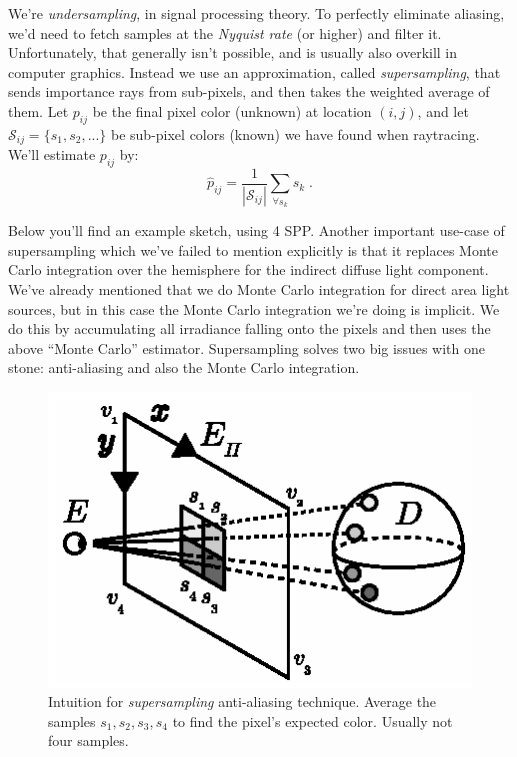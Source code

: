 \documentclass[a4paper, twocolumn]{article}
\begin{document}
            We're \emph{undersampling}, in signal processing theory. To perfectly eliminate aliasing, we'd need to fetch samples at the \emph{Nyquist rate} (or higher) and filter it. Unfortunately, that generally isn't possible, and is usually also overkill in computer graphics. Instead we use an approximation, called \emph{supersampling}, that sends importance rays from sub-pixels, and then takes the weighted average of them. Let \(p_{ij}\) be the final pixel color (unknown) at location \((i,j)\), and let \(\mathcal{S}_{ij} = \{s_1, s_2, ...\}\) be sub-pixel colors (known) we have found when raytracing. We'll estimate \(p_{ij}\) by: \[\hat{p}_{ij} = \frac{1}{|\mathcal{S}_{ij}|}\sum_{\forall s_k } s_k \; .\]

            Below you'll find an example sketch, using 4 SPP. Another important use-case of supersampling which we've failed to mention explicitly is that it replaces Monte Carlo integration over the hemisphere for the indirect diffuse  light component. We've already mentioned that we do Monte Carlo integration for direct area light sources, but in this case the Monte Carlo integration we're doing is implicit. We do this by accumulating all irradiance falling onto the pixels and then uses the above ``Monte Carlo'' estimator. Supersampling solves two big issues with one stone: anti-aliasing and also the Monte Carlo integration.

            \begin{figure}[ht]
                \centering
                \includegraphics[width=0.8\linewidth]{share/supersampling.eps}
                \caption{Intuition for \emph{supersampling} anti-aliasing technique. Average the samples \(s_1, s_2, s_3, s_4\) to find the pixel's expected color. Usually not four samples.}
                \label{fig:supersampling}
            \end{figure}
\end{document}

